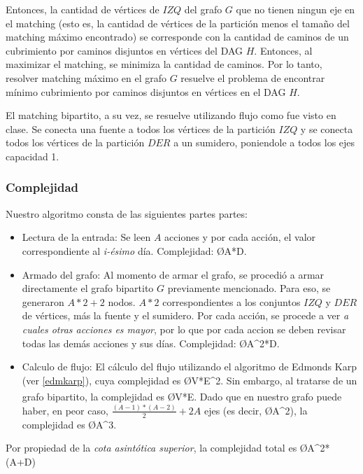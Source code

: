 Entonces, la cantidad de vértices de $IZQ$ del grafo $G$ que no tienen ningun eje en el matching (esto es, la cantidad de vértices de la partición menos el tamaño del matching máximo encontrado) se corresponde con la cantidad de caminos de un cubrimiento por caminos disjuntos en vértices del DAG $H$. Entonces, al maximizar el matching, se minimiza la cantidad de caminos. Por lo tanto, resolver matching máximo en el grafo $G$ resuelve el problema de encontrar mínimo cubrimiento por caminos disjuntos en vértices en el DAG $H$.

El matching bipartito, a su vez, se resuelve utilizando flujo como fue visto en clase. Se conecta una fuente a todos los vértices de la partición $IZQ$ y se conecta todos los vértices de la partición $DER$ a un sumidero, poniendole a todos los ejes capacidad 1.

\subsubsection{Complejidad}
Nuestro algoritmo consta de las siguientes partes partes:
\begin{itemize}
	\item Lectura de la entrada: Se leen $A$ acciones y por cada acción, el valor correspondiente al \emph{i-ésimo} día. Complejidad: \O{A*D}.
	\item Armado del grafo: Al momento de armar el grafo, se procedió a armar directamente el grafo bipartito $G$ previamente mencionado. Para eso, se generaron $A*2+2$ nodos. $A*2$ correspondientes a los conjuntos $IZQ$ y $DER$ de vértices, más la fuente y el sumidero. Por cada acción, se procede a ver \emph{a cuales otras acciones es mayor}, por lo que por cada accion se deben revisar todas las demás acciones y sus días. Complejidad: \O{A^2*D}.
	\item Calculo de flujo: El cálculo del flujo utilizando el algoritmo de Edmonds Karp (ver \ref{edmkarp}), cuya complejidad es \O{V*E^2}. Sin embargo, al tratarse de un grafo bipartito, la complejidad es \O{V*E}\textsuperscript{\cite{cormen}}. Dado que en nuestro grafo puede haber, en peor caso, $\frac{(A-1)*(A-2)}{2}+2A$ ejes (es decir, \O{A^2}), la complejidad es \O{A^3}.
\end{itemize}

Por propiedad de la \emph{cota asintótica superior}, la complejidad total es
\O{A^2*(A+D)}